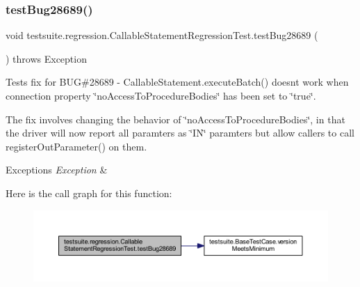 \subsubsection{\texorpdfstring{test\+Bug28689()}{testBug28689()}}
{\footnotesize\ttfamily void testsuite.\+regression.\+Callable\+Statement\+Regression\+Test.\+test\+Bug28689 (\begin{DoxyParamCaption}{ }\end{DoxyParamCaption}) throws Exception}

Tests fix for B\+UG\#28689 -\/ Callable\+Statement.\+execute\+Batch() doesn\textquotesingle{}t work when connection property \char`\"{}no\+Access\+To\+Procedure\+Bodies\char`\"{} has been set to \char`\"{}true\char`\"{}.

The fix involves changing the behavior of \char`\"{}no\+Access\+To\+Procedure\+Bodies\char`\"{}, in that the driver will now report all paramters as \char`\"{}\+I\+N\char`\"{} paramters but allow callers to call register\+Out\+Parameter() on them.


\begin{DoxyExceptions}{Exceptions}
{\em Exception} & \\
\hline
\end{DoxyExceptions}
Here is the call graph for this function\+:
\nopagebreak
\begin{figure}[H]
\begin{center}
\leavevmode
\includegraphics[width=350pt]{classtestsuite_1_1regression_1_1_callable_statement_regression_test_ad52f0f9cf573c237f9b51732bcb429e8_cgraph}
\end{center}
\end{figure}
\mbox{\label{classtestsuite_1_1regression_1_1_callable_statement_regression_test_a28a91e6259cced18e90ef08947170c38}} 

